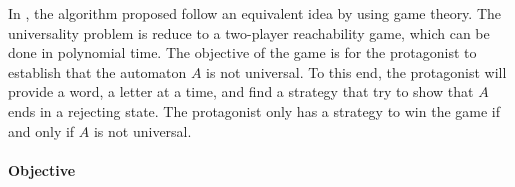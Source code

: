 \documentclass[letterpaper]{article}
\DeclarePairedDelimiter{\ceil}{\lceil}{\rceil}
\theoremstyle{definition}
\begin{document}


In
\cite{AC_universality}, the algorithm proposed follow an equivalent
idea by using game theory. The universality problem is reduce to
a two-player reachability game, which can be done in polynomial time.
The objective of the game is for the protagonist to establish that
the automaton $A$ is not universal. To this end, the protagonist will
provide a word, a letter at a time, and find a strategy that try
to show that $A$ ends in a rejecting state.
The protagonist only has a strategy to win the game if and only if $A$ is
not universal.


\paragraph{Objective}
\end{document}
